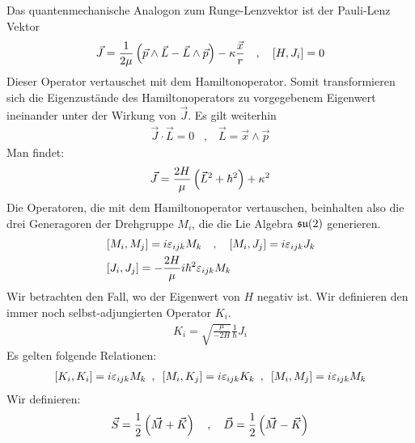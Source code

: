 Das quantenmechanische Analogon zum Runge-Lenzvektor ist der Pauli-Lenz Vektor
\begin{align*}
    \vec{J} = \frac{1}{2 \mu} \left( \vec{p} \wedge \vec{L} - \vec{L} \wedge \vec{p} \right)
        - \kappa \frac{\vec{x}}{r}
    \hspace{10pt} , \hspace{10pt}
    \left[ H,J_i \right] = 0
\end{align*}
Dieser Operator vertauschet mit dem Hamiltonoperator. Somit transformieren sich
die Eigenzustände des Hamiltonoperators zu vorgegebenem Eigenwert ineinander
unter der Wirkung von $\vec{J}$. Es gilt weiterhin
\begin{align*}
    \vec{J} \cdot \vec{L} = 0
    \hspace{10pt} , \hspace{10pt}
    \vec{L} = \vec{x} \wedge \vec{p}
\end{align*}
Man findet:
\begin{align*}
    \vec{J} = \frac{2H}{\mu} \left( \vec{L}^2 + \hbar^2 \right) + \kappa^2
\end{align*}
Die Operatoren, die mit dem Hamiltonoperator vertauschen, beinhalten also die
drei Generagoren der Drehgruppe $M_i$, die die Lie Algebra $\mathfrak{su}(2)$ generieren.
\begin{align*}
    &\left[ M_i , M_j \right] = i \varepsilon_{ijk} M_k
    \hspace{10pt} , \hspace{10pt}
    \left[ M_i,J_j \right] = i \varepsilon_{ijk} J_k
    \\
    &\left[ J_i,J_j \right] = - \frac{2H}{\mu} i \hbar^2 \varepsilon_{ijk} M_k
\end{align*}
Wir betrachten den Fall, wo der Eigenwert von $H$ negativ ist. Wir definieren
den immer noch selbst-adjungierten Operator $K_i$.
\begin{align*}
    K_i = \sqrt{\frac{\mu}{-2H}} \frac{1}{\hbar} J_i
\end{align*}
Es gelten folgende Relationen:
\begin{align*}
    \left[ K_i,K_i \right] = i \varepsilon_{ijk} M_k
    \hspace{5pt} , \hspace{5pt}
    \left[ M_i,K_j \right] = i \varepsilon_{ijk} K_k
    \hspace{5pt} , \hspace{5pt}
    \left[ M_i,M_j \right] = i \varepsilon_{ijk} M_k
\end{align*}
Wir definieren:
\begin{align*}
    \vec{S} = \frac{1}{2} \left( \vec{M} + \vec{K} \right)
    \hspace{10pt} , \hspace{10pt}
    \vec{D} = \frac{1}{2} \left( \vec{M} - \vec{K} \right)
\end{align*}
